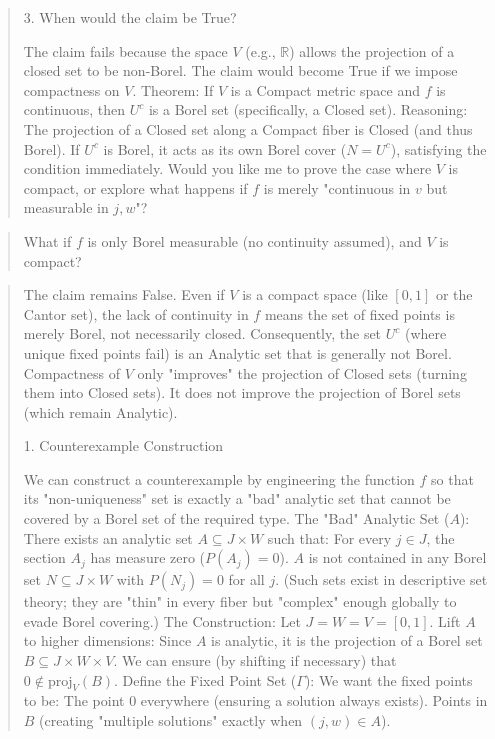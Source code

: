 \begin{Rem}
{\begin{quote}
3. When would the claim be True?

The claim fails because the space $V$ (e.g., $\mathbb{R}$) allows the projection of a closed set to be non-Borel. The claim would become True if we impose compactness on $V$.
Theorem: If $V$ is a Compact metric space and $f$ is continuous, then $U^c$ is a Borel set (specifically, a Closed set).
Reasoning: The projection of a Closed set along a Compact fiber is Closed (and thus Borel). If $U^c$ is Borel, it acts as its own Borel cover ($N=U^c$), satisfying the condition immediately.
Would you like me to prove the case where $V$ is compact, or explore what happens if $f$ is merely "continuous in $v$ but measurable in $j,w$"?
    \end{quote}
    \begin{quote}
      What if $f$ is only Borel measurable (no continuity assumed), and $V$ is compact?
    \end{quote}
    \begin{quote}
The claim remains False.
Even if $V$ is a compact space (like $[0,1]$ or the Cantor set), the lack of continuity in $f$ means the set of fixed points is merely Borel, not necessarily closed. Consequently, the set $U^c$ (where unique fixed points fail) is an Analytic set that is generally not Borel.
Compactness of $V$ only "improves" the projection of Closed sets (turning them into Closed sets). It does not improve the projection of Borel sets (which remain Analytic).

1. Counterexample Construction

We can construct a counterexample by engineering the function $f$ so that its "non-uniqueness" set is exactly a "bad" analytic set that cannot be covered by a Borel set of the required type.
The "Bad" Analytic Set ($A$):
There exists an analytic set $A \subseteq J \times W$ such that:
For every $j \in J$, the section $A_j$ has measure zero ($P(A_j) = 0$).
$A$ is not contained in any Borel set $N \subseteq J \times W$ with $P(N_j) = 0$ for all $j$.
(Such sets exist in descriptive set theory; they are "thin" in every fiber but "complex" enough globally to evade Borel covering.)
The Construction:
Let $J = W = V = [0,1]$.
Lift $A$ to higher dimensions: Since $A$ is analytic, it is the projection of a Borel set $B \subseteq J \times W \times V$. We can ensure (by shifting if necessary) that $0 \notin \text{proj}_V(B)$.
Define the Fixed Point Set ($\Gamma$): We want the fixed points to be:
The point $0$ everywhere (ensuring a solution always exists).
Points in $B$ (creating "multiple solutions" exactly when $(j,w) \in A$).


\end{quote}}
\end{Rem}
